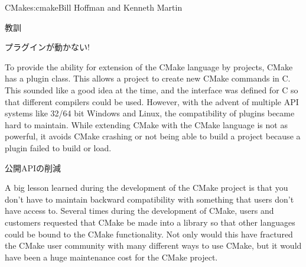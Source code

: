\begin{aosachapter}{CMake}{s:cmake}{Bill Hoffman and Kenneth Martin}
\begin{aosasect1}{教訓}
\begin{aosasect2}{プラグインが動かない!}

To provide the ability for extension of the CMake language by
projects, CMake has a plugin class. This allows a project to create
new CMake commands in C. This sounded like a good idea at
the time, and the interface was defined for C so that different
compilers could be used. However, with the advent of multiple API
systems like 32/64 bit Windows and Linux, the compatibility of plugins
became hard to maintain. While extending CMake with the CMake language
is not as powerful, it avoids CMake crashing or not being able
to build a project because a plugin failed to build or load.

\end{aosasect2}

\begin{aosasect2}{公開APIの削減}

A big lesson learned during the development of the CMake project is
that you don't have to maintain backward compatibility with something
that users don't have access to. Several times during the development
of CMake, users and customers requested that CMake be made into a
library so that other languages could be bound to the CMake
functionality. Not only would this have fractured the CMake user
community with many different ways to use CMake, but it would have
been a huge maintenance cost for the CMake project.

\end{aosasect2}

\end{aosasect1}

\end{aosachapter}
